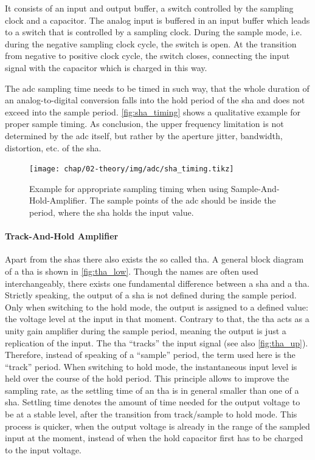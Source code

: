 It consists of an input and output buffer, a switch controlled by the sampling clock and a capacitor.
The analog input is buffered in an input buffer which leads to a switch that is controlled by a sampling clock.
During the sample mode, i.e. during the negative sampling clock cycle, the switch is open.
At the transition from negative to positive clock cycle, the switch closes, connecting the input signal with the capacitor which is charged in this way.

The \gls{adc} sampling time needs to be timed in such way, that the whole duration of an analog-to-digital conversion falls into the hold period of the \gls{sha} and does not exceed into the sample period. 
\autoref{fig:sha_timing} shows a qualitative example for proper sample timing. 
As conclusion, the upper frequency limitation is not determined by the \gls{adc} itself, but rather by the aperture jitter, bandwidth, distortion, etc. of the \gls{sha}. \cite{walt}

\begin{figure} [H]
	\centering
	\tikzexternaldisable
	\texttt{[image: chap/02-theory/img/adc/sha\_timing.tikz]}  
	\tikzexternalenable
	\caption[SHA timing example]{Example for appropriate sampling timing when using Sample-And-Hold-Amplifier. The sample points of the \gls{adc} should be inside the period, where the \gls{sha} holds the input value.}
	\label{fig:sha_timing}
\end{figure}

\paragraph{Track-And-Hold Amplifier}
Apart from the \glspl{sha} there also exists the so called \gls{tha}. 
A general block diagram of a \gls{tha} is shown in \autoref{fig:tha_low}.
Though the names are often used interchangeably, there exists one fundamental difference between a \gls{sha} and a \gls{tha}.
Strictly speaking, the output of a \gls{sha} is not defined during the sample period. 
Only when switching to the hold mode, the output is assigned to a defined value: the voltage level at the input in that moment.
Contrary to that, the \gls{tha} acts as a unity gain amplifier during the sample period, meaning the output is just a replication of the input. 
The \gls{tha} ``tracks'' the input signal (see also \autoref{fig:tha_up}).
Therefore, instead of speaking of a ``sample'' period, the term used here is the ``track'' period.
When switching to hold mode, the instantaneous input level is held over the course of the hold period.
This principle allows to improve the sampling rate, as the settling time of an \gls{tha} is in general smaller than one of a \gls{sha}.
Settling time denotes the amount of time needed for the output voltage to be at a stable level, after the transition from track/sample to hold mode.
This process is quicker, when the output voltage is already in the range of the sampled input at the moment, instead of when the hold capacitor first has to be charged to the input voltage. \cite{Reeder2017}

